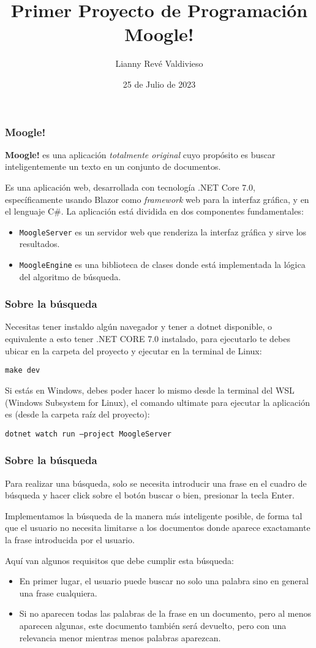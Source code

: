 \documentclass[12pt]{beamer}
\author{Lianny Revé Valdivieso}
\title{Primer Proyecto de Programación Moogle!}
\institute{Facultad de Matemática y Computación de La Universidad de La Habana}
\date{25 de Julio de 2023}
\begin{document}
\frame{\titlepage}

\begin{frame}
\frametitle{Moogle!}
\textbf{Moogle!} es una aplicación \emph{totalmente original} cuyo propósito es buscar inteligentemente un texto en un conjunto de documentos.

Es una aplicación web, desarrollada con tecnología .NET Core 7.0, específicamente usando Blazor como \emph{framework} web para la interfaz gráfica, y en el lenguaje C\#.
La aplicación está dividida en dos componentes fundamentales:

\begin{itemize}
    \item \texttt{MoogleServer} es un servidor web que renderiza la interfaz gráfica y sirve los resultados.
    \item \texttt{MoogleEngine} es una biblioteca de clases donde está implementada la lógica del algoritmo de búsqueda.
\end{itemize}
\end{frame}

\begin{frame}
\frametitle{Sobre la búsqueda}

Necesitas tener instaldo algún navegador y tener a dotnet disponible, o equivalente a esto tener .NET CORE 7.0 instalado, para ejecutarlo te debes ubicar en la carpeta del proyecto y ejecutar en la terminal de Linux:

\texttt{make dev}

Si estás en Windows, debes poder hacer lo mismo desde la terminal del WSL (Windows Subsystem for Linux), el comando ultimate para ejecutar la aplicación es (desde la carpeta raíz del proyecto):


\texttt{dotnet watch run --project MoogleServer}


\end{frame}

\begin{frame}
\frametitle{Sobre la búsqueda}

Para realizar una búsqueda, solo se necesita introducir una frase en el cuadro de búsqueda y hacer click sobre el botón buscar o bien, presionar la tecla Enter.

Implementamos la búsqueda de la manera más inteligente posible, de forma tal que el usuario no necesita limitarse a los documentos donde aparece exactamante la frase introducida por el usuario.

Aquí van algunos requisitos que debe cumplir esta búsqueda:

\begin{itemize}
\item En primer lugar, el usuario puede buscar no solo una palabra sino en general una frase cualquiera.
\item Si no aparecen todas las palabras de la frase en un documento, pero al menos aparecen algunas, este documento también será devuelto, pero con una relevancia menor mientras menos palabras aparezcan.
\end{itemize}
\end{frame}
\end{document}
